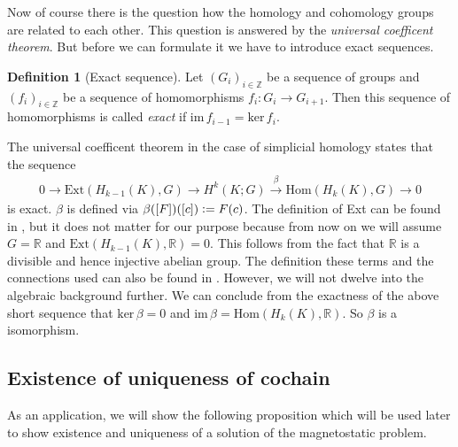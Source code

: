\documentclass[12pt,a4paper]{article}
\numberwithin{equation}{subsection}
\numberwithin{lemma}{subsection}
\theoremstyle{definition}
\newtheorem{definition}[lemma]{Definition}
\newcommand{\integers}{\mathbb{Z}}
\newcommand{\real}{\mathbb{R}}
\begin{document}
Now of course there is the question how the homology and cohomology groups 
are related to each other. This question is answered by the
\textit{universal coefficent theorem}. But before we can formulate it we have 
to introduce exact sequences.
\begin{definition}[Exact sequence]
    Let $(G_i)_{i\in \integers}$ be a sequence of groups and 
    $(f_i)_{i \in \integers}$ be a sequence of homomorphisms
    $f_i: G_i \rightarrow G_{i+1}$. Then this sequence of homomorphisms is
    called \textit{exact} if $\text{im}\,f_{i-1} = \text{ker}\,f_i$.
\end{definition}

The universal coefficent theorem in the case of simplicial homology states
that the sequence 
\begin{align}
    0 \rightarrow \text{Ext}(H_{k-1}(K),G) \rightarrow 
    H^k(K;G) \xrightarrow{\beta} \text{Hom}(H_k(K),G) 
    \rightarrow 0 \label{eq:univeral_coefficient_theorem}
\end{align}
is exact. 
$\beta$ is defined via $\beta([F])([c]) \vcentcolon= F(c)$.
The definition of Ext can be found in \cite{topology_and_geometry},
but it does not matter for our purpose because from now on we will assume
$G = \real$ and
$\text{Ext}(H_{k-1}(K),\real) = 0$. This follows from the fact that 
$\real$ is a divisible and hence injective abelian group. The definition 
these terms and the connections used can also be found in 
\cite[Sec.\,V.6]{topology_and_geometry}. However, we will not dwelve into the 
algebraic background further. We can conclude from the exactness of the 
above short sequence that $\text{ker}\,\beta = 0$ and 
$\text{im}\,\beta = \text{Hom}(H_k(K),\real)$. So $\beta$ is a isomorphism.

\subsection{Existence of uniqueness of cochain}



As an application, we will show the following proposition which will be used
later to show existence and uniqueness of a 
solution of the magnetostatic problem.
\end{document}
